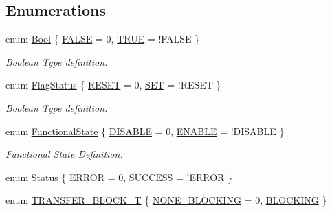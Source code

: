 \subsection*{Enumerations}
\begin{DoxyCompactItemize}
\item 
enum \hyperlink{group__LPC__Types__Public__Types_ga39db6982619d623273fad8a383489309}{Bool} \{ \hyperlink{group__LPC__Types__Public__Types_gga39db6982619d623273fad8a383489309aa1e095cc966dbecf6a0d8aad75348d1a}{F\+A\+L\+SE} = 0, 
\hyperlink{group__LPC__Types__Public__Types_gga39db6982619d623273fad8a383489309aa82764c3079aea4e60c80e45befbb839}{T\+R\+UE} = !\+F\+A\+L\+SE
 \}\begin{DoxyCompactList}\small\item\em Boolean Type definition. \end{DoxyCompactList}
\item 
enum \hyperlink{group__LPC__Types__Public__Types_ga89136caac2e14c55151f527ac02daaff}{Flag\+Status} \{ \hyperlink{group__LPC__Types__Public__Types_gga89136caac2e14c55151f527ac02daaffa589b7d94a3d91d145720e2fed0eb3a05}{R\+E\+S\+ET} = 0, 
\hyperlink{group__LPC__Types__Public__Types_gga89136caac2e14c55151f527ac02daaffab44c8101cc294c074709ec1b14211792}{S\+ET} = !\+R\+E\+S\+ET
 \}\begin{DoxyCompactList}\small\item\em Boolean Type definition. \end{DoxyCompactList}
\item 
enum \hyperlink{group__LPC__Types__Public__Types_gac9a7e9a35d2513ec15c3b537aaa4fba1}{Functional\+State} \{ \hyperlink{group__LPC__Types__Public__Types_ggac9a7e9a35d2513ec15c3b537aaa4fba1ad3a9df141be0ccf10389b640f492b26d}{D\+I\+S\+A\+B\+LE} = 0, 
\hyperlink{group__LPC__Types__Public__Types_ggac9a7e9a35d2513ec15c3b537aaa4fba1a7d46875fa3ebd2c34d2756950eda83bf}{E\+N\+A\+B\+LE} = !\+D\+I\+S\+A\+B\+LE
 \}\begin{DoxyCompactList}\small\item\em Functional State Definition. \end{DoxyCompactList}
\item 
enum \hyperlink{group__LPC__Types__Public__Types_ga67a0db04d321a74b7e7fcfd3f1a3f70b}{Status} \{ \hyperlink{group__LPC__Types__Public__Types_gga67a0db04d321a74b7e7fcfd3f1a3f70ba2fd6f336d08340583bd620a7f5694c90}{E\+R\+R\+OR} = 0, 
\hyperlink{group__LPC__Types__Public__Types_gga67a0db04d321a74b7e7fcfd3f1a3f70bac7f69f7c9e5aea9b8f54cf02870e2bf8}{S\+U\+C\+C\+E\+SS} = !\+E\+R\+R\+OR
 \}
\item 
enum \hyperlink{group__LPC__Types__Public__Types_gaf5297347bed33665c55dd0e9c7840403}{T\+R\+A\+N\+S\+F\+E\+R\+\_\+\+B\+L\+O\+C\+K\+\_\+T} \{ \hyperlink{group__LPC__Types__Public__Types_ggaf5297347bed33665c55dd0e9c7840403ae00130e64382c35d172d226b79aa9acb}{N\+O\+N\+E\+\_\+\+B\+L\+O\+C\+K\+I\+NG} = 0, 
\hyperlink{group__LPC__Types__Public__Types_ggaf5297347bed33665c55dd0e9c7840403a854a1cd6e3a98db9e290dddea29725e7}{B\+L\+O\+C\+K\+I\+NG}
 \}
\end{DoxyCompactItemize}


